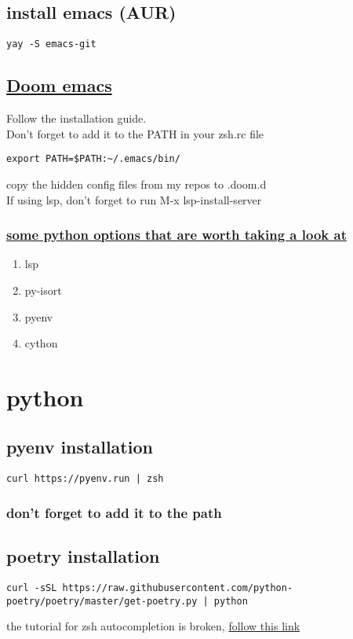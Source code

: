 \documentclass[11pt]{article}
\begin{document}
\subsection{install emacs (AUR)}
\label{sec:orgbf3628c}
\begin{verbatim}
yay -S emacs-git
\end{verbatim}
\subsection{\href{https://github.com/hlissner/doom-emacs}{Doom emacs}}
\label{sec:org1a70b4a}
Follow the installation guide.\\
Don't forget to add it to the PATH in your zsh.rc file\\
\begin{verbatim}
export PATH=$PATH:~/.emacs/bin/
\end{verbatim}
copy the hidden config files from my repos to .doom.d\\
If using lsp, don't forget to run M-x lsp-install-server\\
\subsubsection{\href{https://github.com/hlissner/doom-emacs/blob/develop/modules/lang/python/README.org}{some python options that are worth taking a look at}}
\label{sec:org3887162}
\begin{enumerate}
\item lsp
\label{sec:org592bdca}
\item py-isort
\label{sec:orgd8608c7}
\item pyenv
\label{sec:org76cc863}
\item cython
\label{sec:org95711ea}
\end{enumerate}
\section{python}
\label{sec:org2d2b941}
\subsection{pyenv installation}
\label{sec:org1292f15}
\begin{verbatim}
curl https://pyenv.run | zsh
\end{verbatim}
\subsubsection{don't forget to add it to the path}
\label{sec:org14ece25}
\subsection{poetry installation}
\label{sec:org63b9f37}
\begin{verbatim}
curl -sSL https://raw.githubusercontent.com/python-poetry/poetry/master/get-poetry.py | python
\end{verbatim}
the tutorial for zsh autocompletion is broken, \href{https://github.com/python-poetry/poetry/issues/1734}{follow this link}\\
\end{document}
